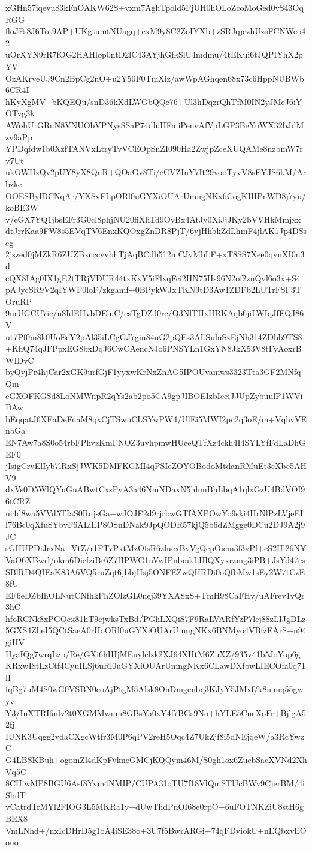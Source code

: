 xGHn57iqevu83kFnOAKW62S+vxm7AghTpold5FjUH0hOLoZcoMoGed0vS43OqRGG
floJFs8J6Tot9AP+UKgtumtNUagq+exM9y8C2ZoIYXb+zSRJqjezhUzsFCNWeo42
uOrXYN9rR7fOG2HAHlop0ntD2lC43AYjhGfkSlU4mdmu/4tEKui6tJQPIYhX2pYV
OzAKrveUJ9Cn2BpCg2nO+u2Y50F0TmXlz/awWpAGhqen68x73c6HppNUBWb6CR4I
hKyXgMV+bKQEQu/snD36kXdLWGbQQc76+Ul3hDqzrQhTfM0IN2yJMeJ6iYOTvg3k
AWohUrGRuN8VNUObVPNysSSaP74dluHFmiPenvAfVpLGP3BeYuWX32bJdMzv9aPp
YPDqfdw1b0XzfTANVxLtryTvVCEOpSnZI090Ha2ZwjpZceXUQAMe8nzbmW7rv7Ut
ukOWHzQv2pUY8yX8QuR+QOaGv8Ti/eCVZInY7It29vooTyvV8sEYJS6kM/Arbzkc
OOESBylDCNqAr/YXSvFLpORl0uGYXiOUArUmngNKx6CogKIHPnWD8j7yu/koBE3W
v/eGX7YQ1jbsEFr3G0cl8phjNU20fiXliTd9OyBx4AtJy0XiJjJKy2bVVHkMmjxx
dtJrrKaa9FW8s5EVqTV6EnxKQOxgZnDR8PjT/6yjHhbkZdLhmF4jlAK1Jp4DSseg
2jszed0jMZkR6ZUZBxcccvvbhTjAqBCdb512mCJvMbLF+xT8SS7Xee0qvnXI0n3d
cQX8IAg0IX1gE2tTRjVDUR44txKxY5iFlxqFci2HN75Hs96N2of2znQvl6o3x+S4
pAJycSR9V2qIYWF0loF/zkgamf+0BPykWJxTKN9tD3Aw1ZDFb2LUTrFSF3TOruRP
9nrUGCU7ic/n8IdEHvbDEluC/esTgDZd0re/Q3NlTHxHRKAqb6jiLWIqJfEQJ86V
ut7Pf0m8k0UoEeY2pAl35iLCgGJ7giu84uG2pQEs3ALSuluSzEjNh314ZDbb9TS8
+KhQ74qJFPpxEG8bxDqJ6CwCAencNJo6PNSYLn1GxYN8JkX53V8tFyAoxrBWIDvC
byQyjPr4hjCar2xGK9urfGjF1yyxwKrNxZnAG5IPOUvamws3323Tta3GF2MNfqQm
cGXOFKGSd8LoNMWnpR2qYs2ab2po5CA9gpJIBOEIzbIeciJJUpZybuulP1WViDAw
bEqqatJ6XEaDeFuaM8qxCjTSwuCLSYwPW4/UlEi5MWI2pc2q3oE/m+VqhvVEnbGa
EN7Aw7a8S0o54rbFPhvzKmFNOZ3uvhpmwHUeeQTfXz4ckh4I4SYLYfFdLaDhGEF0
jIsigCrvElIyb7lRxSjJWK5DMFKGMI4qPSIeZOYOBodoMtdanRMuEt3cXbc5AHV9
dxVs0D5WlQYuGuABwtCxsPyA3a46NmNDaxN5hhmBhLbqA1qlxGzU4BdVOI96tCRZ
ui4d8wa5VVd5TIaS0RujsGa+wJOJF2d9rjrbwGTfAXPOwYo9ski4HrNlPzLVjeEI
l76Bc0qXfuSYbvF6ALiEP8OSnDNak9JpQODR57kjQ5b6dZMgge0DCu2DJ9A2j9JC
sGHUPDiJrxNa+VtZ/r1FTvPxtMzOfsR6zlucxBvVgQepOicm3f3vPf+cS2Hl26NY
VaO6XBwrl/okm6DiefziBr6Z7HPWG1nVwIPnbmkLIIlQXyxrzmg3iPB+JsYd47es
SBlRD4QIEaK83A6VQ5ruZqt6jbbjHsj5ONFEZwQHRDi0oQfbMw1sEy2W7tCzE8fU
EF6eDZbIhOLNutCNfhkFhZOlzGL0nej39YXASxS+TmH98CaFHv/uAFrev1vQr3hC
hfoRCNk8xPGQcx81hT9ejwksTxBd/PGhLXQiS7F9RaLVARfYzP7lej88zLIJgDLz
5GXS4ZheI5QCtSaeA0rHoORl0uGYXiOUArUmngNKx6BNMyo4VBfzEArS+n94giHV
HyaIQg7wrqLzp/Re/GXi6hIHjMEuylclzk2XJ64XHtM6ZuXZ/935v41b5JoYop6g
KRxwI8tLzCtf4CyuILSj6uRl0uGYXiOUArUmngNKx6CLawDXfbwLIECOfa0q71lI
fqBg7uM4S0wG0VSBN0coAjPtgM5Alsk8OnDmgenbq3KJyY5JMxf/k8nunq55gwyv
Y3/IuXTRI6nlv2t0XGMMwum8GBsYa0xY4f7BGs9No+hYLE5CneXoFr+BjlgA52fj
IUNK3Uqgg2vdaCXgcWtfr3M0P6qPV2reH5Oqc4Z7UkZjf8i5dNEjqeW/a3RcYwzC
G4LBSKBuh+ogomZl4dKpFvkneGMCjKQQym46M/S0gh1ox6ZucbSacXVNd2XhVq5C
8CHiwMP8BGU6Asf8Yvm4NMIP/CUPA31oTU7f18VlQmSTlJcBWv9CjerBM/4iSbdT
vCatrdTrMYl2FIOG3L5MKRa1y+dUwThdPnOI68e0rpO+6uFOTNKZiU8stH6gBEX8
VmLNhd+/nxIcDHrD5g1oA4iSE38o+3U7f5BwrARGi+74qFDviokU+nEQbxvEOono
